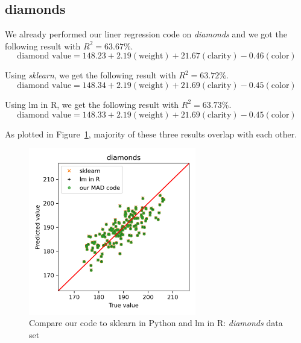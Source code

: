 \documentclass[
	letterpaper
]{article}
\begin{document}
\subsection{diamonds}
We already performed our liner regression code on \textit{diamonds} and we got the following result with $R^2 = 63.67\%$.
\begin{equation}
\text{diamond value} = 148.23+ 2.19 (\text{weight}) + 21.67(\text{clarity})-0.46(\text{color})
\end{equation}

Using \textit{sklearn}, we get the following result with $R^2 = 63.72\%$.
\begin{equation}
\text{diamond value} = 148.34 + 2.19 (\text{weight}) + 21.69(\text{clarity})-0.45(\text{color})
\end{equation}

Using lm in R, we get the following result with $R^2 = 63.73\%$.
\begin{equation}
\text{diamond value} = 148.33 + 2.19 (\text{weight}) + 21.69(\text{clarity})-0.45(\text{color})
\end{equation}

As plotted in Figure~\ref{fig:compare-diamonds}, majority of these three results overlap with each other. 
\begin{figure}[htbp]
	\centering
	\includegraphics[width=0.65\textwidth]{figures/compare-diamonds.png}
	\caption{Compare our code to sklearn in Python and lm in R: \textit{diamonds} data set}
	\label{fig:compare-diamonds}
\end{figure}
\end{document}
